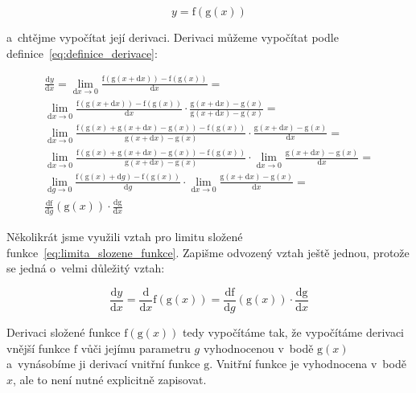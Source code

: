 \begin{equation}
y = \mathrm{f}(\mathrm{g}(x))
\end{equation}

a~chtějme vypočítat její derivaci. Derivaci můžeme vypočítat podle definice~\eqref{eq:definice_derivace}:

\begin{equation}
\label{eq:derivace_slozene_funkce_vypocet}
\begin{split}
\frac{\mathrm{d}y}{\mathrm{d}x} = \lim_{\mathrm{d}x \to 0} \frac{\mathrm{f}(\mathrm{g}(x + \mathrm{d}x)) - \mathrm{f}(\mathrm{g}(x))}{\mathrm{d}x} = \\
\lim_{\mathrm{d}x \to 0} \frac{\mathrm{f}(\mathrm{g}(x + \mathrm{d}x)) - \mathrm{f}(\mathrm{g}(x))}{\mathrm{d}x} \cdot \frac{\mathrm{g}(x + \mathrm{d}x) - \mathrm{g}(x)}{\mathrm{g}(x + \mathrm{d}x) - \mathrm{g}(x)} = \\
\lim_{\mathrm{d}x \to 0} \frac{\mathrm{f}(\mathrm{g}(x) + \mathrm{g}(x + \mathrm{d}x) - \mathrm{g}(x)) - \mathrm{f}(\mathrm{g}(x))}{\mathrm{g}(x + \mathrm{d}x) - \mathrm{g}(x)} \cdot \frac{\mathrm{g}(x + \mathrm{d}x) - \mathrm{g}(x)}{\mathrm{d}x} = \\
\lim_{\mathrm{d}x \to 0} \frac{\mathrm{f}(\mathrm{g}(x) + \mathrm{g}(x + \mathrm{d}x) - \mathrm{g}(x)) - \mathrm{f}(\mathrm{g}(x))}{\mathrm{g}(x + \mathrm{d}x) - \mathrm{g}(x)} \cdot \lim_{\mathrm{d}x \to 0} \frac{\mathrm{g}(x + \mathrm{d}x) - \mathrm{g}(x)}{\mathrm{d}x} = \\
\lim_{\mathrm{d}g \to 0} \frac{\mathrm{f}(\mathrm{g}(x) + \mathrm{d}g) - \mathrm{f}(\mathrm{g}(x))}{\mathrm{d}g} \cdot \lim_{\mathrm{d}x \to 0} \frac{\mathrm{g}(x + \mathrm{d}x) - \mathrm{g}(x)}{\mathrm{d}x} = \\
\frac{\mathrm{df}}{\mathrm{d}g}(\mathrm{g}(x)) \cdot \frac{\mathrm{dg}}{\mathrm{d}x}
\end{split}
\end{equation}

Několikrát jsme využili vztah pro limitu složené funkce~\eqref{eq:limita_slozene_funkce}. Zapišme odvozený vztah ještě jednou, protože se jedná o~velmi důležitý vztah:

\begin{equation}
\frac{\mathrm{d}y}{\mathrm{d}x} = \frac{\mathrm{d}}{\mathrm{d}x}\mathrm{f}(\mathrm{g}(x)) = \frac{\mathrm{df}}{\mathrm{d}g}(\mathrm{g}(x)) \cdot \frac{\mathrm{dg}}{\mathrm{d}x}
\end{equation}

Derivaci složené funkce \(\mathrm{f}(\mathrm{g}(x))\) tedy vypočítáme tak, že vypočítáme derivaci vnější funkce \(\mathrm{f}\) vůči jejímu parametru \(g\) vyhodnocenou v~bodě \(\mathrm{g}(x)\) a~vynásobíme ji derivací vnitřní funkce \(\mathrm{g}\). Vnitřní funkce je vyhodnocena v~bodě \(x\), ale to není nutné explicitně zapisovat.

